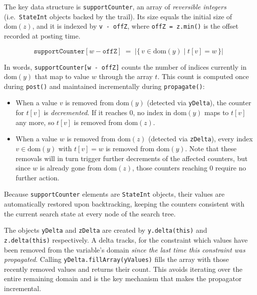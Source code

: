 \documentclass[11pt, a4paper]{scrartcl}
\begin{document}
The key data structure is \texttt{supportCounter},
an array of \emph{reversible integers} (i.e.\ \texttt{StateInt} objects backed by the trail).
Its size equals the initial size of $\mathrm{dom}(z)$, and it is indexed by \texttt{v - offZ},
where \texttt{offZ = z.min()} is the offset recorded at posting time.

\[
  \texttt{supportCounter}[w - \texttt{offZ}]
  \;=\;
  \bigl|\{\, v \in \mathrm{dom}(y) \mid t[v] = w \,\}\bigr|
\]

In words, \texttt{supportCounter[w - offZ]} counts the number of indices currently in $\mathrm{dom}(y)$ that map to value $w$ through the array $t$.
This count is computed once during \texttt{post()} and maintained incrementally during \texttt{propagate()}:

\begin{itemize}
    \item When a value $v$ is removed from $\mathrm{dom}(y)$ (detected via \texttt{yDelta}), the counter for $t[v]$ is \emph{decremented}.
          If it reaches $0$, no index in $\mathrm{dom}(y)$ maps to $t[v]$ any more, so $t[v]$ is removed from $\mathrm{dom}(z)$.
    \item When a value $w$ is removed from $\mathrm{dom}(z)$ (detected via \texttt{zDelta}), every index $v \in \mathrm{dom}(y)$ with $t[v] = w$ is removed from $\mathrm{dom}(y)$.
          Note that these removals will in turn trigger further decrements of the affected counters, but since $w$ is already gone from $\mathrm{dom}(z)$, those counters reaching $0$ require no further action.
\end{itemize}

Because \texttt{supportCounter} elements are \texttt{StateInt} objects, their values are automatically restored upon backtracking,
keeping the counters consistent with the current search state at every node of the search tree.

The objects \texttt{yDelta} and \texttt{zDelta} are created by \texttt{y.delta(this)} and \texttt{z.delta(this)} respectively.
A delta tracks, for the constraint which values have been removed from the variable's domain \emph{since the last time this constraint was propagated}.
Calling \texttt{yDelta.fillArray(yValues)} fills the array with those recently removed values and returns their count.
This avoids iterating over the entire remaining domain and is the key mechanism that makes the propagator incremental.
\end{document}

